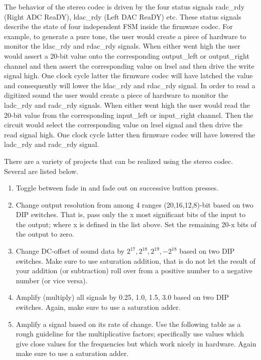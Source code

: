 \begin{enumerate}
The behavior of the stereo codec is driven by the four status signals
radc\_rdy (Right ADC ReaDY), ldac\_rdy (Left DAC ReaDY) etc.  These
status signals describe the state of four independent FSM inside the 
firmware codec.  For example, to generate a pure tone, the user 
would create a piece of hardware to monitor the ldac\_rdy and rdac\_rdy
signals.  When either went high the user would assert a 20-bit value
onto the corresponding output\_left or output\_right channel and then assert
the corresponding value on lrsel and then drive the write signal high.
One clock cycle latter the firmware codec will have latched the value
and consequently will lower the ldac\_rdy and rdac\_rdy signal.
In order to read a digitized sound the user 
would create a piece of hardware to monitor the ladc\_rdy and radc\_rdy
signals.  When either went high the user would read the 20-bit value
from the corresponding input\_left or input\_right channel.  Then the
circuit would select the corresponding value on lrsel signal and then 
drive the read signal high.  One clock cycle latter then firmware codec 
will have lowered the ladc\_rdy and radc\_rdy signal.


There are a variety of projects that can be realized using the stereo
codec.  Several are listed below.
\begin{enumerate}
\item Toggle between fade in and fade out on successive button presses.
\item Change output resolution from among 4 ranges (20,16,12,8)-bit 
based on two DIP switches.  That is, pass only the x most significant bits 
of the input to the output; where x is defined in the list above.  Set the
remaining 20-x bits of the output to zero.
\item Change DC-offset of sound data by $2^{17}, 2^{18}, 2^{19}, -2^{18}$ 
based on two DIP switches.  Make sure to use saturation addition, that
is do not let the result of your addition (or subtraction) roll over from a
positive number to a negative number (or vice versa).
\item Amplify (multiply) all signals by 0.25, 1.0, 1.5, 3.0 based on two
DIP switches.  Again, make sure to use a saturation adder.  
\item Amplify a signal based on its rate of change.  Use the following 
table as a rough guideline for the multiplicative factors; specifically 
use values which give close values for the frequencies but which work 
nicely in hardware.  Again make sure to use a saturation adder.


\end{enumerate}
\end{enumerate}
